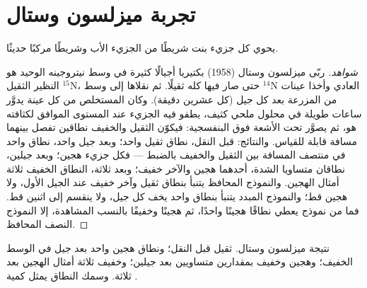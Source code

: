 \section{تجربة ميزلسون وستال}

\begin{proposition}\label{prop:g11:dna-replication:semiconservative}
يحوي كل جزيء  بنت شريطًا من الجزيء الأب وشريطًا مركبًا حديثًا.
\end{proposition}
\begin{proof}[شواهد]
ربّى ميزلسون وستال (1958) بكتيريا أجيالًا كثيرة في وسط نيتروجينه
الوحيد هو النظير الثقيل $^{15}$N، حتى صار  فيها كله ثقيلًا. ثم
نقلاها إلى وسط $^{14}$N العادي وأخذا عينات من المزرعة بعد كل جيل (كل
عشرين دقيقة). وكان  المستخلص من كل عينة يدوَّر ساعات طويلة في محلول
ملحي كثيف، يطفو فيه الجزيء عند المستوى الموافق لكثافته هو، ثم يصوَّر
تحت الأشعة فوق البنفسجية: فيكوّن  الثقيل والخفيف نطاقين تفصل
بينهما مسافة قابلة للقياس. والنتائج: قبل النقل، نطاق ثقيل واحد؛ وبعد
جيل واحد، نطاق واحد في منتصف المسافة بين الثقيل والخفيف بالضبط ---
فكل جزيء هجين؛ وبعد جيلين، نطاقان متساويا الشدة، أحدهما هجين والآخر
خفيف؛ وبعد ثلاثة، النطاق الخفيف ثلاثة أمثال الهجين. والنموذج المحافظ
يتنبأ بنطاق ثقيل وآخر خفيف عند الجيل الأول، ولا هجين قط؛ والنموذج
المبدد يتنبأ بنطاق واحد يخف كل جيل، ولا ينقسم إلى اثنين قط. فما من
نموذج يعطي نطاقًا هجينًا واحدًا، ثم هجينًا وخفيفًا بالنسب المشاهدة،
إلا النموذج النصف المحافظ.
\end{proof}

\begin{omfigure}

{\small نتيجة ميزلسون وستال.  ثقيل قبل النقل؛ ونطاق هجين واحد بعد
جيل في الوسط الخفيف؛ وهجين وخفيف بمقدارين متساويين بعد جيلين؛ وخفيف
ثلاثة أمثال الهجين بعد ثلاثة. وسمك النطاق يمثل كمية .}
\end{omfigure}

